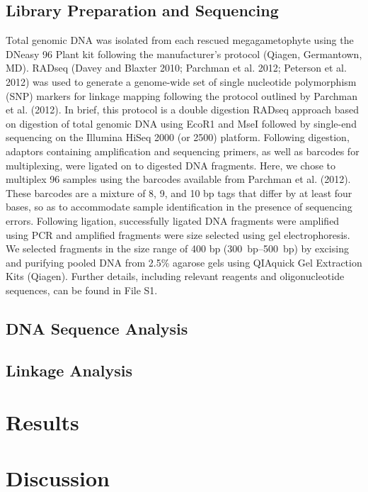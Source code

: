 \documentclass[11pt]{article}
\begin{document}
\subsection{Library Preparation and Sequencing}
Total genomic DNA was isolated from each rescued megagametophyte using the DNeasy 96 Plant 
kit following the manufacturer’s protocol (Qiagen, Germantown, MD). RADseq (Davey and Blaxter 2010; Parchman et al. 2012; Peterson et al. 2012) 
was used to generate a genome-wide set of 
single nucleotide polymorphism (SNP) markers for linkage mapping following the protocol 
outlined by Parchman et al. (2012). In brief, this protocol is a double digestion RADseq 
approach based on digestion of total genomic DNA using EcoR1 and MseI followed by single-end 
sequencing on the Illumina HiSeq 2000 (or 2500) platform. Following digestion, adaptors 
containing amplification and sequencing primers, as well as barcodes for multiplexing, 
were ligated on to digested DNA fragments. Here, we chose to multiplex 96 samples using the 
barcodes available from Parchman et al. (2012). These barcodes are a mixture of 8, 9, and 
10 bp tags that differ by at least four bases, so as to accommodate sample identification in the 
presence of sequencing errors. Following ligation, successfully ligated DNA fragments were 
amplified using PCR and amplified fragments were size selected using gel electrophoresis. We selected 
fragments in the size range of 400 bp (\SIrange{300}{500}{bp}) by excising and purifying pooled DNA from 2.5\% 
agarose gels using QIAquick Gel Extraction Kits (Qiagen). Further details, including relevant reagents and 
oligonucleotide sequences, can be found in File S1. 


\subsection{DNA Sequence Analysis}

\subsection{Linkage Analysis}

\section{Results}

\section{Discussion}
\end{document}

